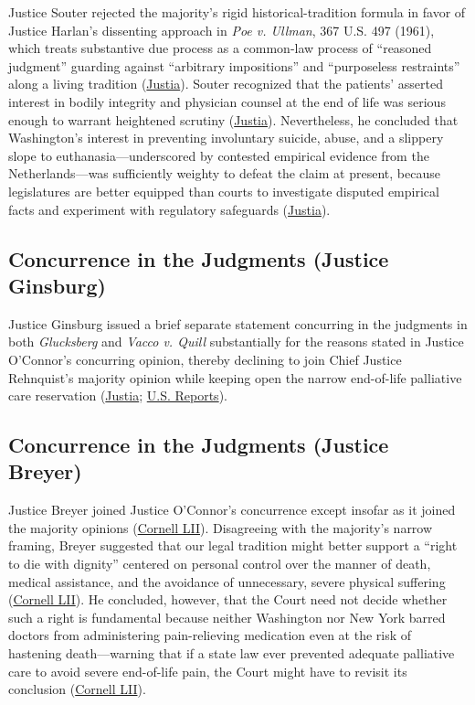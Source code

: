 \documentclass[12pt]{article}
\begin{document}
Justice Souter rejected the majority's rigid historical-tradition formula in favor of Justice Harlan's dissenting approach in \textit{Poe v. Ullman}, 367 U.S. 497 (1961), which treats substantive due process as a common-law process of ``reasoned judgment'' guarding against ``arbitrary impositions'' and ``purposeless restraints'' along a living tradition (\href{https://supreme.justia.com/cases/federal/us/521/702/}{Justia}). Souter recognized that the patients' asserted interest in bodily integrity and physician counsel at the end of life was serious enough to warrant heightened scrutiny (\href{https://supreme.justia.com/cases/federal/us/521/702/}{Justia}). Nevertheless, he concluded that Washington's interest in preventing involuntary suicide, abuse, and a slippery slope to euthanasia---underscored by contested empirical evidence from the Netherlands---was sufficiently weighty to defeat the claim at present, because legislatures are better equipped than courts to investigate disputed empirical facts and experiment with regulatory safeguards (\href{https://supreme.justia.com/cases/federal/us/521/702/}{Justia}).

\subsection{Concurrence in the Judgments (Justice Ginsburg)}

Justice Ginsburg issued a brief separate statement concurring in the judgments in both \textit{Glucksberg} and \textit{Vacco v. Quill} substantially for the reasons stated in Justice O'Connor's concurring opinion, thereby declining to join Chief Justice Rehnquist's majority opinion while keeping open the narrow end-of-life palliative care reservation (\href{https://supreme.justia.com/cases/federal/us/521/702/}{Justia}; \href{https://tile.loc.gov/storage-services/service/ll/usrep/usrep521/usrep521702/usrep521702.pdf}{U.S. Reports}).

\subsection{Concurrence in the Judgments (Justice Breyer)}

Justice Breyer joined Justice O'Connor's concurrence except insofar as it joined the majority opinions (\href{https://www.law.cornell.edu/supct/html/96-110.ZC4.html}{Cornell LII}). Disagreeing with the majority's narrow framing, Breyer suggested that our legal tradition might better support a ``right to die with dignity'' centered on personal control over the manner of death, medical assistance, and the avoidance of unnecessary, severe physical suffering (\href{https://www.law.cornell.edu/supct/html/96-110.ZC4.html}{Cornell LII}). He concluded, however, that the Court need not decide whether such a right is fundamental because neither Washington nor New York barred doctors from administering pain-relieving medication even at the risk of hastening death---warning that if a state law ever prevented adequate palliative care to avoid severe end-of-life pain, the Court might have to revisit its conclusion (\href{https://www.law.cornell.edu/supct/html/96-110.ZC4.html}{Cornell LII}).
\end{document}
